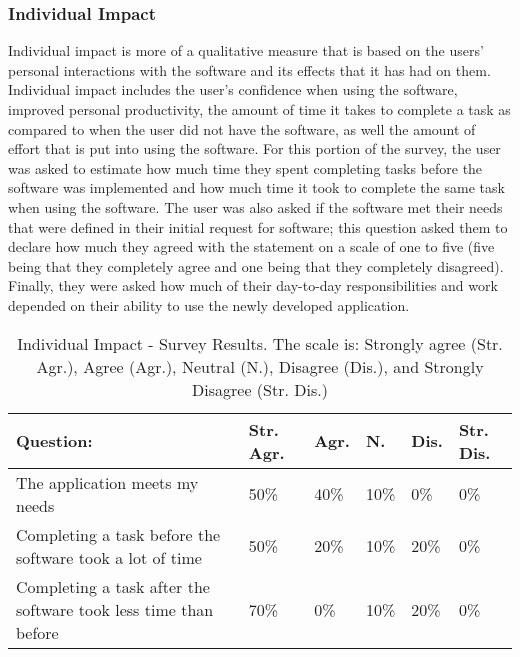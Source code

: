 \subsubsection{Individual Impact}
Individual impact is more of a qualitative measure that is based on the users' personal interactions with the software and its effects that it has had on them. Individual impact includes the user's confidence when using the software, improved personal productivity, the amount of time it takes to complete a task as compared to when the user did not have the software, as well the amount of effort that is put into using the software. For this portion of the survey, the user was asked to estimate how much time they spent completing tasks before the software was implemented and how much time it took to complete the same task when using the software. The user was also asked if the software met their needs that were defined in their initial request for software; this question asked them to declare how much they agreed with the statement on a scale of one to five (five being that they completely agree and one being that they  completely disagreed). Finally, they were asked how much of their day-to-day responsibilities and work depended on their ability to use the newly developed application.


\begin{table}
\caption{Individual Impact - Survey Results. The scale is: Strongly agree (Str. Agr.), Agree (Agr.), Neutral (N.), Disagree (Dis.), and Strongly Disagree (Str. Dis.)}
\label{table:usersatisfaction}
\begin{tabular}{p{2.6cm}p{.75cm}p{.75cm}p{.75cm}p{.75cm}p{.75cm}}
Question: & Str. Agr. & Agr. & N. & Dis. & Str. Dis. \\
 \hline
The application meets my needs & 50\% & 40\% & 10\% & 0\% & 0\% \\
Completing a task before the software took a lot of time & 50\% & 20\% & 10\% & 20\% & 0\% \\
Completing a task after the software took less time than before & 70\% & 0\% & 10\% & 20\% & 0\% \\
\end{tabular}
\end{table}


